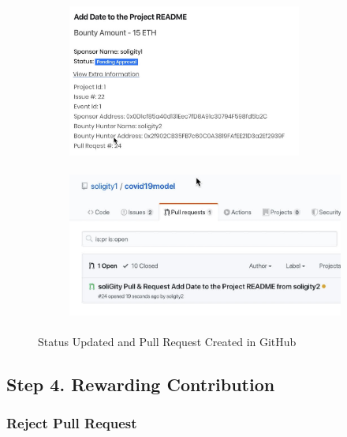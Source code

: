 \documentclass[12pt]{article}
\renewcommand{\_}{\kern-1.5pt\textunderscore\kern-1.5pt}
\begin{document}
\begin{figure}[H]
	\centering
	\begin{subfigure}[b]{.40\textwidth}
		\centering
		\includegraphics[height=5cm]{graphs/36. issue_info_updated}
	\end{subfigure}
	\begin{subfigure}[b]{.58\textwidth}
		\centering
		\includegraphics[height=5cm]{graphs/37. bob_pull_request_github}
	\end{subfigure}

	\caption{Status Updated and Pull Request Created in GitHub}
\end{figure}


\subsection{Step 4. Rewarding Contribution}

\subsubsection{Reject Pull Request}
\end{document}
